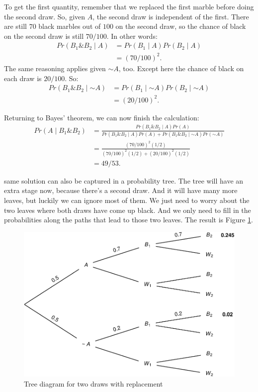 \documentclass[justified]{tufte-book}
\newcommand{\given}{\mid}
\renewcommand{\neg}{\mathbin{\sim}}
\renewcommand{\wedge}{\mathbin{\&}}
\newcommand{\p}{Pr}
\theoremstyle{definition}
\theoremstyle{definition}
\theoremstyle{definition}
\theoremstyle{remark}
\begin{document}
To get the first quantity, remember that we replaced the first marble before doing the second draw. So, given \(A\), the second draw is independent of the first. There are still \(70\) black marbles out of \(100\) on the second draw, so the chance of black on the second draw is still \(70/100\). In other words:
\[
  \begin{aligned}
    \p(B_1 \wedge B_2 \given A) &= \p(B_1 \given A) \p(B_2 \given A)\\
      &= (70/100)^2.
  \end{aligned}
\]
The same reasoning applies given \(\neg A\), too. Except here the chance of black on each draw is \(20/100\). So:
\[
  \begin{aligned}
    \p(B_1 \wedge B_2 \given \neg A) &= \p(B_1 \given \neg A) \p(B_2 \given \neg A)\\
      &= (20/100)^2.
  \end{aligned}
\]

Returning to Bayes' theorem, we can now finish the calculation:
\[
  \begin{aligned}
    \p(A \given B_1 \wedge B_2) &= \frac{\p(B_1 \wedge B_2 \given A)\p(A)}{\p(B_1 \wedge B_2 \given A) \p(A) + \p(B_1 \wedge B_2 \given \neg A) \p(\neg A)} \\ 
    &= \frac{(70/100)^2(1/2)}{(70/100)^2(1/2) + (20/100)^2(1/2)}\\
    &= 49/53.
  \end{aligned}
\]

 same solution can also be captured in a probability tree. The tree will have an extra stage now, because there's a second draw. And it will have many more leaves, but luckily we can ignore most of them. We just need to worry about the two leaves where both draws have come up black. And we only need to fill in the probabilities along the paths that lead to those two leaves. The result is Figure \ref{fig:twodrawsreplacement}.

\begin{figure}
\includegraphics{_main_files/figure-latex/twodrawsreplacement-1} \caption[Tree diagram for two draws with replacement]{Tree diagram for two draws with replacement}\label{fig:twodrawsreplacement}
\end{figure}
\end{document}
